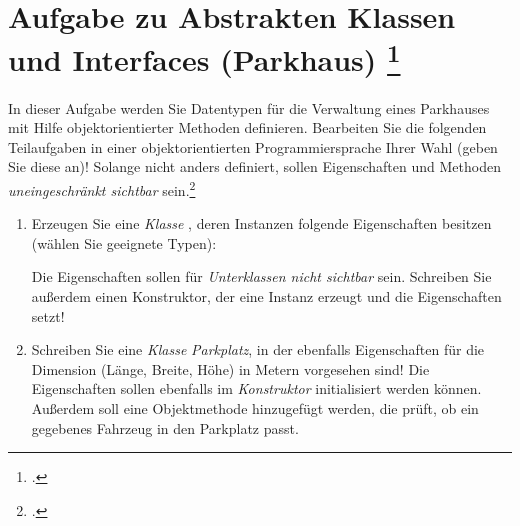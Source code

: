 \documentclass{lehramt-informatik-aufgabe}
\begin{document}

\section{Aufgabe zu Abstrakten Klassen und Interfaces (Parkhaus)
\footcite[Thema 2 Teilaufgabe 2 Aufgabe 1 Seite 11]{examen:66116:2014:03}
}

In dieser Aufgabe werden Sie Datentypen für die Verwaltung eines
Parkhauses mit Hilfe objektorientierter Methoden definieren. Bearbeiten
Sie die folgenden Teilaufgaben in einer objektorientierten
Programmiersprache Ihrer Wahl (geben Sie diese an)! Solange nicht anders
definiert, sollen Eigenschaften und Methoden \emph{uneingeschränkt
sichtbar} sein.\footcite{aud:ab:1}

\begin{enumerate}


\item Erzeugen Sie eine \emph{Klasse}
, deren Instanzen folgende Eigenschaften besitzen (wählen
Sie geeignete Typen):


Die Eigenschaften sollen für \emph{Unterklassen nicht sichtbar} sein.
Schreiben Sie außerdem einen Konstruktor, der eine Instanz erzeugt und
die Eigenschaften setzt!

\begin{antwort}
\end{antwort}


\item Schreiben Sie eine \emph{Klasse} \emph{Parkplatz}, in der
ebenfalls Eigenschaften für die Dimension (Länge, Breite, Höhe) in
Metern vorgesehen sind! Die Eigenschaften sollen ebenfalls im
\emph{Konstruktor} initialisiert werden können. Außerdem soll eine
Objektmethode hinzugefügt werden, die prüft, ob ein gegebenes Fahrzeug
in den Parkplatz passt.


\end{enumerate}
\end{document}
